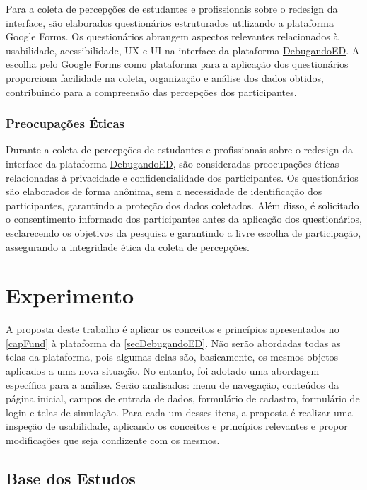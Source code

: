 Para a coleta de percepções de estudantes e profissionais sobre o redesign da interface, são elaborados questionários estruturados utilizando a plataforma Google Forms. Os questionários abrangem aspectos relevantes relacionados à usabilidade, acessibilidade,  \ac{UX} e \ac{UI} na interface da plataforma \href{https://debugandoed.facom.ufu.br/}{DebugandoED}. A escolha pelo Google Forms como plataforma para a aplicação dos questionários proporciona facilidade na coleta, organização e análise dos dados obtidos, contribuindo para a compreensão das percepções dos participantes.

\subsubsection{Preocupações Éticas}

Durante a coleta de percepções de estudantes e profissionais sobre o redesign da interface da plataforma \href{https://debugandoed.facom.ufu.br/}{DebugandoED}, são consideradas preocupações éticas relacionadas à privacidade e confidencialidade dos participantes. Os questionários são elaborados de forma anônima, sem a necessidade de identificação dos participantes, garantindo a proteção dos dados coletados. Além disso, é solicitado o consentimento informado dos participantes antes da aplicação dos questionários, esclarecendo os objetivos da pesquisa e garantindo a livre escolha de participação, assegurando a integridade ética da coleta de percepções.

\section{Experimento}
\label{secExperimentos}

A proposta deste trabalho é aplicar os conceitos e princípios apresentados no \autoref{capFund} à plataforma da \autoref{secDebugandoED}. Não serão abordadas todas as telas da plataforma, pois algumas delas são, basicamente, os mesmos objetos aplicados a uma nova situação. No entanto, foi adotado uma abordagem específica para a análise. Serão analisados: menu de navegação, conteúdos da página inicial, campos de entrada de dados, formulário de cadastro, formulário de login e telas de simulação. Para cada um desses itens, a proposta é realizar uma inspeção de usabilidade, aplicando os conceitos e princípios relevantes e propor modificações que seja condizente com os mesmos.

\subsection{Base dos Estudos}

